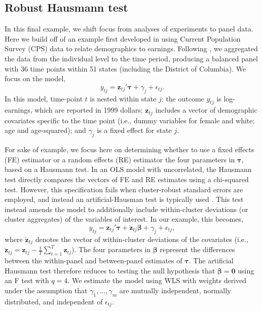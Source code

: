 \documentclass[12pt]{article}\usepackage[]{graphicx}\usepackage[]{color}
\newcommand{\bm}{\mathbf}
\newcommand{\bs}{\boldsymbol}
\begin{document}
\subsection{Robust Hausmann test} 

In this final example, we shift focus from analyses of experiments to panel data. Here we build off of an example first developed in \citet{Bertrand2004how} using Current Population Survey (CPS) data to relate demographics to earnings. Following \citet{Cameron2015practitioners}, we aggregated the data from the individual level to the time period, producing a balanced panel with 36 time points within 51 states (including the District of Columbia). We focus on the model,
\begin{equation}
y_{tj} = \bm{z}_{tj}'\bs\tau + \gamma_j + \epsilon_{tj}.
\end{equation}
In this model, time-point $t$ is nested within state $j$; the outcome $y_{tj}$ is log-earnings, which are reported in 1999 dollars; $\bm{z}_{tj}$ includes a vector of demographic covariates specific to the time point (i.e., dummy variables for female and white; age and age-squared); and $\gamma_j$ is a fixed effect for state $j$. 

For sake of example, we focus here on determining whether to use a fixed effects (FE) estimator or a random effects (RE) estimator the four parameters in $\bs\tau$, based on a Hausmann test. In an OLS model with uncorrelated, the Hausmann test directly compares the vectors of FE and RE estimates using a chi-squared test. However, this specification fails when cluster-robust standard errors are employed, and instead an artificial-Hausman test \citep{Arellano1993on} is typically used \citep[pp. 290-291]{Wooldridge2002econometric}. This test instead amends the model to additionally include within-cluster deviations (or cluster aggregates) of the variables of interest. In our example, this becomes,
\begin{equation}
y_{tj} = \bm{z}_{tj}'\bs\tau + \bm{\ddot{z}}_{tj}\bs\beta + \gamma_j + \epsilon_{tj},
\end{equation}
where $\bm{\ddot{z}}_{tj}$ denotes the vector of within-cluster deviations of the covariates (i.e., $\bm{\ddot{z}}_{tj} = \bm{z}_{tj} - \frac{1}{T}\sum_{t=1}^T \bm{z}_{tj}$).
The four parameters in $\bs\beta$ represent the differences between the within-panel and between-panel estimates of $\bs\tau$. The artificial Hausmann test therefore reduces to testing the null hypothesis that $\bs\beta = \bm{0}$ using an F test with $q = 4$. We estimate the model using WLS with weights derived under the assumption that  $\gamma_1,...,\gamma_m$ are mutually independent, normally distributed, and independent of $\epsilon_{tj}$.
\end{document}
